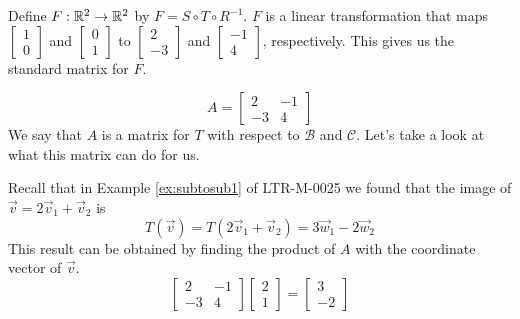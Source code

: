 \documentclass{ximera}
\begin{document}
\begin{exploration}
\begin{expandable}
\begin{center}
\end{center}
\end{expandable}

Define $F:\mathbb{R}^2\rightarrow \mathbb{R}^2$ by $F=S\circ T\circ R^{-1}$.  $F$ is a linear transformation that maps $\begin{bmatrix}1\\0\end{bmatrix}$ and $\begin{bmatrix}0\\1\end{bmatrix}$ to $\begin{bmatrix}2\\-3\end{bmatrix}$ and $\begin{bmatrix}-1\\4\end{bmatrix}$, respectively.  This gives us the standard matrix for $F$.


$$A=\begin{bmatrix}2&-1\\-3&4\end{bmatrix}$$
We say that $A$ is a matrix for $T$ with respect to $\mathcal{B}$ and $\mathcal{C}$.  Let's take a look at what this matrix can do for us.

Recall that in Example \ref{ex:subtosub1} of LTR-M-0025 we found that the image of $\vec{v}=2\vec{v}_1+\vec{v}_2$ is $$T(\vec{v})=T(2\vec{v}_1+\vec{v}_2)=3\vec{w}_1-2\vec{w}_2$$
This result can be obtained by finding the product of $A$ with the coordinate vector of  $\vec{v}$.
$$\begin{bmatrix}2&-1\\-3&4\end{bmatrix}\begin{bmatrix}2\\1\end{bmatrix}=\begin{bmatrix}3\\-2\end{bmatrix}$$


\end{exploration}
\end{document}
